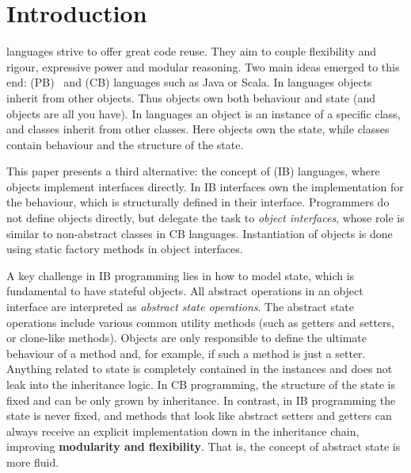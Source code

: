\section{Introduction}\label{sec:intro}

\Objectoriented languages strive to offer great code reuse.
They aim to couple flexibility and rigour, expressive power and
modular reasoning.  Two main ideas emerged to this end: 
\prototypebased (PB)~\cite{Ungar87self} and \classbased (CB) languages such as
Java or Scala.  In \prototypebased
languages objects inherit from other objects. Thus objects own
both behaviour and state (and objects are all you have).
In \classbased languages an object is an instance of a specific class,
and classes inherit from other classes.  Here objects own the state,
while classes contain behaviour and the structure of the state.

This paper presents a third alternative: the concept of
\textbf{\interfacebased} (IB) \objectoriented languages, where objects 
implement interfaces directly. In IB interfaces own the implementation
for the behaviour, which is structurally defined in their
interface. Programmers do not define objects directly, but delegate
the task to \emph{object interfaces}, whose role is similar to non-abstract 
classes in CB languages. Instantiation of objects is
done using static factory methods in object interfaces.

A key challenge in IB programming lies in how to model state, which is
fundamental to have stateful objects. All abstract operations in an
object interface are interpreted as \emph{abstract state
  operations}. The abstract state operations include various common
utility methods (such as getters and setters, or clone-like
methods). Objects are only responsible to define the ultimate
behaviour of a method and, for example, if such a method is just a
setter. Anything related to state is completely contained in the
instances and does not leak into the inheritance logic.  In CB
programming, the structure of the state is fixed and can be only grown
by inheritance.  In contrast, in IB programming the state is never
fixed, and methods that look like abstract setters and getters
can always receive an explicit implementation down in the inheritance
chain, improving \textbf{modularity and flexibility}.  That is, the
concept of abstract state is more fluid.

